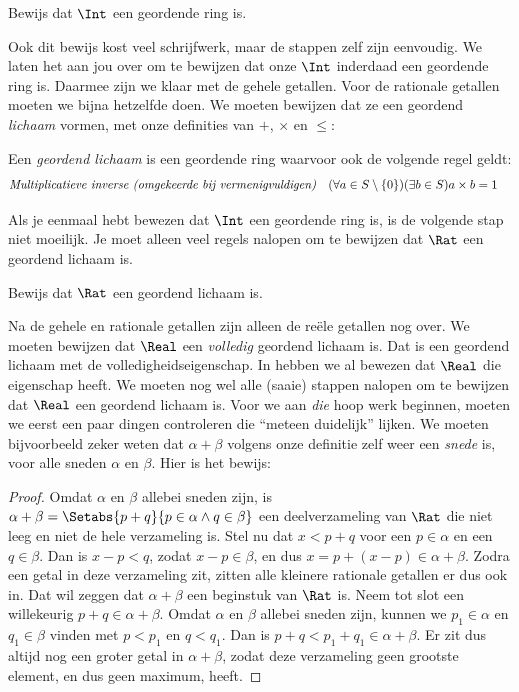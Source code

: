 \documentclass[openany]{memoir}
\begin{document}
\begin{prob}
Bewijs dat $\Int$ een geordende ring is. 
\end{prob}
Ook dit bewijs kost veel schrijfwerk, maar de stappen zelf zijn
eenvoudig. We laten het aan jou over om te bewijzen dat onze
$\Int$ inderdaad een geordende ring is.
Daarmee zijn we klaar met de gehele getallen. Voor de rationale getallen moeten we
bijna hetzelfde doen. We moeten bewijzen dat ze een geordend
\emph{lichaam} vormen, met onze definities van $+$, $\times$ en
$\leq$:
\begin{defn}
Een \emph{geordend lichaam} is een geordende ring waarvoor ook de volgende regel geldt:
\begin{align*}
	\emph{Multiplicatieve inverse (omgekeerde bij vermenigvuldigen)}& & (\forall a \in S \setminus \{0\})(\exists b \in S) a\times b& = 1
\end{align*}
\end{defn}
Als je eenmaal hebt bewezen dat $\Int$ een geordende ring is, is de
volgende stap niet moeilijk. Je moet alleen veel regels nalopen om
te bewijzen dat $\Rat$ een geordend lichaam is.
\begin{prob}
Bewijs dat $\Rat$ een geordend lichaam is.
\end{prob}
Na de gehele en rationale getallen zijn alleen de reële getallen nog
over. We moeten bewijzen dat $\Real$ een \emph{volledig} geordend
lichaam is. Dat is een geordend lichaam met de
volledigheidseigenschap. In  hebben we
al bewezen dat $\Real$ die eigenschap heeft. We moeten nog wel alle
(saaie) stappen nalopen om te bewijzen dat $\Real$ een geordend
lichaam is.
Voor we aan \emph{die} hoop werk beginnen, moeten we eerst een paar
dingen controleren die ``meteen duidelijk'' lijken. We moeten
bijvoorbeeld zeker weten dat $\alpha + \beta$ volgens onze definitie
zelf weer een \emph{snede} is, voor alle sneden $\alpha$ en $\beta$.
Hier is het bewijs:
\begin{proof}	
Omdat $\alpha$ en $\beta$ allebei sneden zijn, is $\alpha + \beta = \Setabs{p
+ q}{p \in \alpha \land q \in \beta}$ een deelverzameling van $\Rat$ die
niet leeg en niet de hele verzameling is. Stel nu dat $x < p + q$ voor een
$p \in \alpha$ en een $q \in \beta$. Dan is $x - p < q$, zodat $x - p
\in \beta$, en dus $x = p + (x - p) \in \alpha + \beta$. Zodra een
getal in deze verzameling zit, zitten alle kleinere rationale
getallen er dus ook in. Dat wil zeggen dat $\alpha + \beta$ een
beginstuk van $\Rat$ is. Neem tot slot een willekeurig $p + q \in
\alpha + \beta$. Omdat $\alpha$ en $\beta$ allebei sneden zijn, kunnen
we $p_1 \in \alpha$ en $q_1 \in \beta$ vinden met $p < p_1$ en $q <
q_1$. Dan is $p + q < p_1 + q_1 \in \alpha + \beta$. Er zit dus
altijd nog een groter getal in $\alpha + \beta$, zodat deze
verzameling geen grootste element, en dus geen maximum, heeft.
\end{proof}
\end{document}
